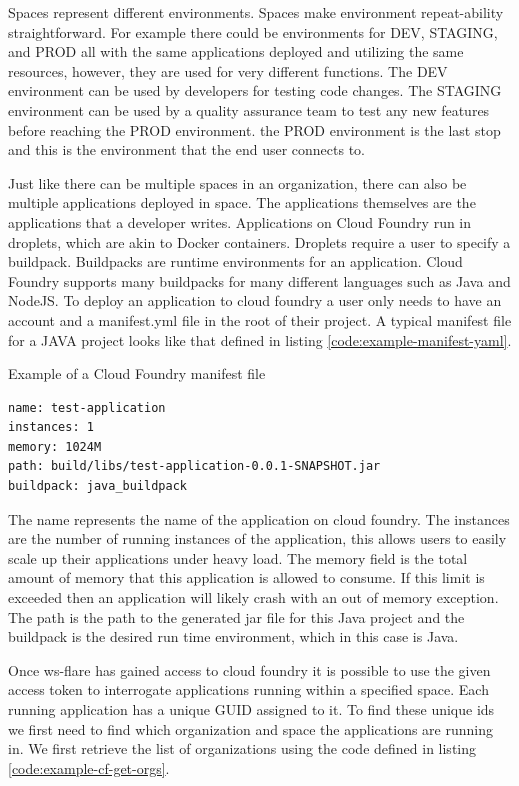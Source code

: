 Spaces represent different environments. Spaces make environment repeat-ability straightforward. For example there could be environments for DEV, STAGING, and PROD  all with the same applications deployed and utilizing the same resources, however, they are used for very different functions. The DEV environment can be used by developers for testing code changes. The STAGING environment can be used by a quality assurance team to test any new features before reaching the PROD environment. the PROD environment is the last stop and this is the environment that the end user connects to.

Just like there can be multiple spaces in an organization, there can also be multiple applications deployed in space. The applications themselves are the applications that a developer writes. Applications on Cloud Foundry run in droplets, which are akin to Docker containers. Droplets require a user to specify a buildpack. Buildpacks are runtime environments for an application. Cloud Foundry supports many buildpacks for many different languages such as Java and NodeJS. To deploy an application to cloud foundry a user only needs to have an account and a manifest.yml file in the root of their project. A typical manifest file for a JAVA project looks like that defined in listing \ref{code:example-manifest-yaml}.

\begin{listing}[H]
    \caption{Example of a Cloud Foundry manifest file}
    \label{code:example-manifest-yaml}
    \begin{verbatim}
name: test-application
instances: 1
memory: 1024M
path: build/libs/test-application-0.0.1-SNAPSHOT.jar
buildpack: java_buildpack
\end{verbatim}
\end{listing}

The name represents the name of the application on cloud foundry. The instances are the number of running instances of the application, this allows users to easily scale up their applications under heavy load. The memory field is the total amount of memory that this application is allowed to consume. If this limit is exceeded then an application will likely crash with an out of memory exception. The path is the path to the generated jar file for this Java project and the buildpack is the desired run time environment, which in this case is Java.

Once ws-flare has gained access to cloud foundry it is possible to use the given access token to interrogate applications running within a specified space. Each running application has a unique GUID assigned to it. To find these unique ids we first need to find which organization and space the applications are running in. We first retrieve the list of organizations using the code defined in listing \ref{code:example-cf-get-orgs}.

